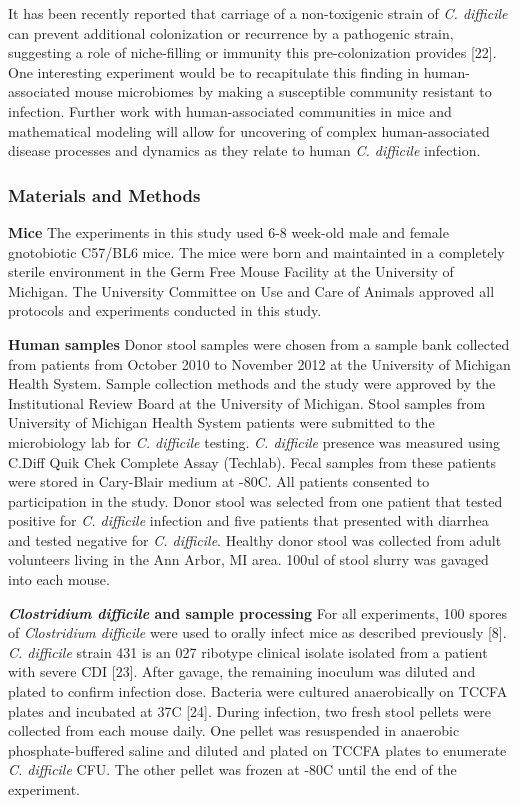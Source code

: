 \documentclass[11pt,]{article}
\begin{document}
It has been recently reported that carriage of a non-toxigenic strain of
\emph{C. difficile} can prevent additional colonization or recurrence by
a pathogenic strain, suggesting a role of niche-filling or immunity this
pre-colonization provides {[}22{]}. One interesting experiment would be
to recapitulate this finding in human-associated mouse microbiomes by
making a susceptible community resistant to infection. Further work with
human-associated communities in mice and mathematical modeling will
allow for uncovering of complex human-associated disease processes and
dynamics as they relate to human \emph{C. difficile} infection.

\subsubsection{Materials and Methods}\label{materials-and-methods}

\textbf{Mice} The experiments in this study used 6-8 week-old male and
female gnotobiotic C57/BL6 mice. The mice were born and maintainted in a
completely sterile environment in the Germ Free Mouse Facility at the
University of Michigan. The University Committee on Use and Care of
Animals approved all protocols and experiments conducted in this study.

\textbf{Human samples} Donor stool samples were chosen from a sample
bank collected from patients from October 2010 to November 2012 at the
University of Michigan Health System. Sample collection methods and the
study were approved by the Institutional Review Board at the University
of Michigan. Stool samples from University of Michigan Health System
patients were submitted to the microbiology lab for \emph{C. difficile}
testing. \emph{C. difficile} presence was measured using C.Diff Quik
Chek Complete Assay (Techlab). Fecal samples from these patients were
stored in Cary-Blair medium at -80C. All patients consented to
participation in the study. Donor stool was selected from one patient
that tested positive for \emph{C. difficile} infection and five patients
that presented with diarrhea and tested negative for \emph{C.
difficile}. Healthy donor stool was collected from adult volunteers
living in the Ann Arbor, MI area. 100ul of stool slurry was gavaged into
each mouse.

\textbf{\emph{Clostridium difficile} and sample processing} For all
experiments, 100 spores of \emph{Clostridium difficile} were used to
orally infect mice as described previously {[}8{]}. \emph{C. difficile}
strain 431 is an 027 ribotype clinical isolate isolated from a patient
with severe CDI {[}23{]}. After gavage, the remaining inoculum was
diluted and plated to confirm infection dose. Bacteria were cultured
anaerobically on TCCFA plates and incubated at 37C {[}24{]}. During
infection, two fresh stool pellets were collected from each mouse daily.
One pellet was resuspended in anaerobic phosphate-buffered saline and
diluted and plated on TCCFA plates to enumerate \emph{C. difficile} CFU.
The other pellet was frozen at -80C until the end of the experiment.
\end{document}
